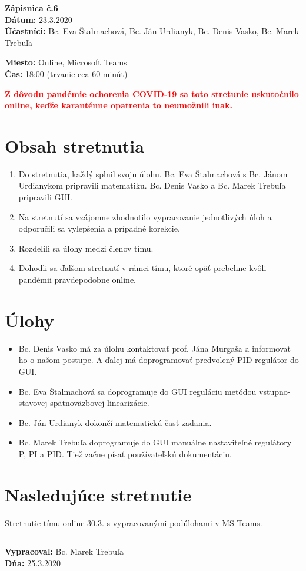 
\usepackage{parskip}%
\usepackage[dvipsnames]{xcolor}

	\textbf{{\Huge Zápisnica č.6}}\\
			
	\textbf{Dátum:} 23.3.2020\\	
		
	\textbf{Účastníci:} Bc. Eva Štalmachová, Bc. Ján Urdianyk, Bc. Denis Vasko, Bc. Marek Trebuľa

	\textbf{Miesto:} Online, Microsoft Teams\\	
	
	\textbf{Čas:} 18:00 (trvanie cca 60 minút)
	
	\textbf{\textcolor{red}{Z dôvodu pandémie ochorenia COVID-19 sa toto stretunie uskutočnilo online, keďže karanténne opatrenia to neumožnili inak.}}   
    \section*{Obsah stretnutia}
    \begin{enumerate}
    	\item Do stretnutia, každý splnil svoju úlohu. Bc. Eva Štalmachová s Bc. Jánom Urdianykom pripravili matematiku. Bc. Denis Vasko a Bc. Marek Trebuľa pripravili GUI.
    	\item Na stretnutí sa vzájomne zhodnotilo vypracovanie jednotlivých úloh a odporučili sa vylepšenia a prípadné korekcie.
    	\item Rozdelili sa úlohy medzi členov tímu.
    	\item Dohodli sa ďalšom stretnutí v rámci tímu, ktoré opäť prebehne kvôli pandémii pravdepodobne online.
    \end{enumerate}    
    \section*{Úlohy}
    \begin{itemize}
    	\item Bc. Denis Vasko má za úlohu kontaktovať prof. Jána Murgaša a informovať ho o našom postupe. A ďalej má doprogramovať predvolený PID regulátor do GUI.
    	\item Bc. Eva Štalmachová sa doprogramuje do GUI reguláciu metódou vstupno-stavovej spätnoväzbovej linearizácie.
    	\item Bc. Ján Urdianyk dokončí matematickú časť zadania.
    	\item Bc. Marek Trebuľa doprogramuje do GUI manuálne nastaviteľné regulátory P, PI a PID. Tiež začne písať používateľskú dokumentáciu. 
    \end{itemize}

    \section*{Nasledujúce stretnutie}
    
    Stretnutie tímu online 30.3. s vypracovanými podúlohami v MS Teams.

    
    \noindent\rule{15cm}{0.4pt}
   {\small 	\textbf{Vypracoval:} Bc. Marek Trebuľa\\
   \textbf{Dňa:} 25.3.2020 }
    

